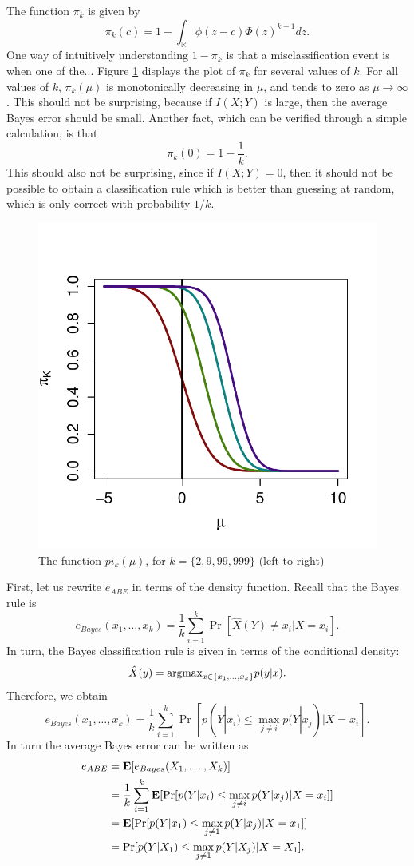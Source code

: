 \documentclass[12pt]{article}
\begin{document}
The function $\pi_k$ is given by
\[
\pi_k(c) = 1 - \int_{\mathbb{R}} \phi(z - c)  \Phi(z)^{k-1} dz.
\]
One way of intuitively understanding $1-\pi_k$ is that a misclassification event is when one of the...
Figure \ref{fig:pi} displays the plot of $\pi_k$ for several values of $k$.
For all values of $k$, $\pi_k(\mu)$ is monotonically decreasing in $\mu$, and tends to zero as $\mu \to \infty$.
This should not be surprising, because if $I(X; Y)$ is large, then the average Bayes error should be small.
Another fact, which can be verified through a simple calculation, is that 
\[
\pi_k(0) = 1 - \frac{1}{k}.
\]
This should also not be surprising, since if $I(X; Y) = 0$, then it should not be possible to
obtain a classification rule which is better than guessing at random, which is only correct with probability $1/k$.
\begin{figure}
\centering
\includegraphics[scale = 0.5, clip=true, trim=0 0.2in 0 0.5in]{../info_theory_sims/illus_piK.pdf}
\caption{The function $pi_k(\mu)$, for $k = \{2, 9, 99, 999\}$ (left to right) \label{fig:pi}}
\end{figure}


First, let us rewrite $e_{ABE}$ in terms of the density function.  Recall that the Bayes rule is
\[
e_{Bayes}(x_1,\hdots, x_k) = \frac{1}{k}\sum_{i=1}^k \Pr[\hat{X}(Y) \neq x_i| X = x_i].
\]
In turn, the Bayes classification rule is given in terms of the conditional density:
\[
\hat{X}(y) = \text{argmax}_{x \in \{x_1,\hdots, x_k\}} p(y|x).
\]
Therefore, we obtain
\[
e_{Bayes}(x_1,\hdots, x_k) = \frac{1}{k}\sum_{i=1}^k \Pr[p(Y|x_i) \leq \max_{j \neq i} p(Y|x_j)| X = x_i].
\]
In turn the average Bayes error can be written as
\begin{align}
e_{ABE} &= \textbf{E}[e_{Bayes}(X_1,\hdots, X_k)]
\\&= \frac{1}{k}\sum_{i=1}^k \textbf{E}[\Pr[p(Y|x_i) \leq \max_{j \neq i} p(Y|x_j)| X = x_i]]
\\&= \textbf{E}[\Pr[p(Y|x_1) \leq \max_{j \neq 1} p(Y|x_j)| X = x_1]]
\\&= \Pr[p(Y|X_1) \leq \max_{j \neq 1} p(Y|X_j)| X = X_1].
\end{align}
\end{document}
